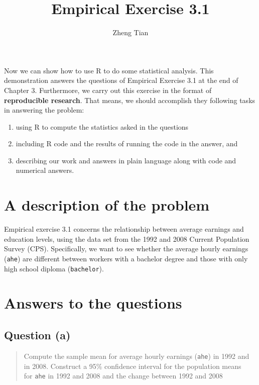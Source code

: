 \documentclass[a4paper,11pt]{article}
\author{Zheng Tian}
\date{}
\title{Empirical Exercise 3.1}
\begin{document}
\maketitle
\tableofcontents

Now we can show how to use R to do some statistical
analysis. This demonstration answers the questions of Empirical
Exercise 3.1 at the end
of Chapter 3. Furthermore, we carry out this exercise in the format of
\textbf{reproducible research}. That means, we should accomplish they
following tasks in answering the problem:
\begin{enumerate}
\item using R to compute the statistics
asked in the questions
\item including R code and the results of running the code in the answer, and
\item describing our work and answers in plain language along with code
and numerical answers.
\end{enumerate}


\section{A description of the problem}
\label{sec:org0e97622}

Empirical exercise 3.1 concerns the relationship between average
earnings and education levels, using the data set from the 1992 and
2008 Current Population Survey (CPS). Specifically, we want to see
whether the average hourly earnings (\texttt{ahe}) are different between
workers with a bachelor degree and those with only high school
diploma (\texttt{bachelor}).

\section{Answers to the questions}
\label{sec:org780fb08}

\subsection*{Question (a)}
\label{sec:org594c6b4}

\begin{verse}
Compute the sample mean for average hourly earnings (\texttt{ahe}) in 1992 and\\
in 2008. Construct a 95\% confidence interval for the population means\\
for \texttt{ahe} in 1992 and 2008 and the change between 1992 and 2008\\
\end{verse}
\end{document}
